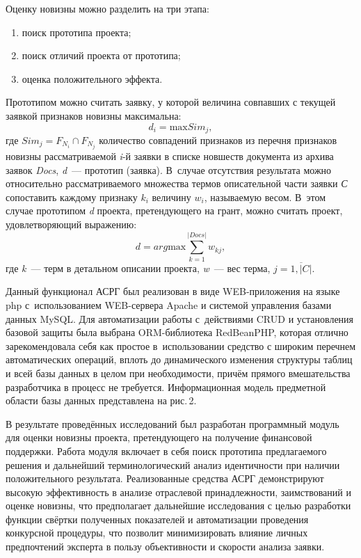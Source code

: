 Оценку новизны можно разделить на три этапа:
\begin{enumerate}[noitemsep]\vspace{-8pt}
    \item поиск прототипа проекта;
    \item поиск отличий проекта от прототипа;
    \item оценка положительного эффекта.
\end{enumerate}\vspace{-8pt}
\clearpage
Прототипом можно считать заявку, у которой величина совпавших с текущей заявкой признаков новизны максимальна:
\begin{equation}
  d_i = \text{max} Sim_j,
\end{equation}
где $Sim_j = F_{N_i} \cap F_{N_j}$ количество совпадений признаков из перечня признаков новизны рассматриваемой \textit{i}-й заявки в списке новшеств документа из архива заявок \textit{Docs}, \textit{d}~--- прототип (заявка). В~случае отсутствия результата можно относительно рассматриваемого множества термов описательной части заявки \textit{С} сопоставить каждому признаку $k_i$ величину $w_i$, называемую весом. В~этом случае прототипом \textit{d} проекта, претендующего на грант, можно считать проект, удовлетворяющий выражению:
\begin{equation}
  d = arg\text{max} \sum_{k=1}^{|Docs|}w_{kj},
\end{equation}
где \textit{k}~--- терм в детальном описании проекта, \textit{w}~--- вес терма, $j=\overline{1,|C|}$.

Данный функционал АСРГ был реализован в виде WEB-приложения на языке php с~использованием WEB-сервера Apache и системой управления базами данных MySQL. Для автоматизации работы с~действиями CRUD и установления базовой защиты была выбрана ORM-библиотека RedBeanPHP, которая отлично зарекомендовала себя как простое в~использовании средство с широким перечнем автоматических операций, вплоть до динамического изменения структуры таблиц и всей базы данных в целом при необходимости, причём прямого вмешательства разработчика в процесс не требуется. Информационная модель предметной области базы данных представлена на рис.\,2.



В результате проведённых исследований был разработан программный модуль для оценки новизны проекта, претендующего на получение финансовой поддержки. Работа модуля включает в себя поиск прототипа предлагаемого решения и дальнейший терминологический анализ идентичности при наличии положительного результата. Реализованные средства АСРГ демонстрируют высокую эффективность в анализе отраслевой принадлежности, заимствований и оценке новизны, что предполагает дальнейшие исследования с целью разработки функции свёртки полученных показателей и автоматизации проведения конкурсной процедуры, что позволит минимизировать влияние личных предпочтений эксперта в пользу объективности и скорости анализа заявки.


